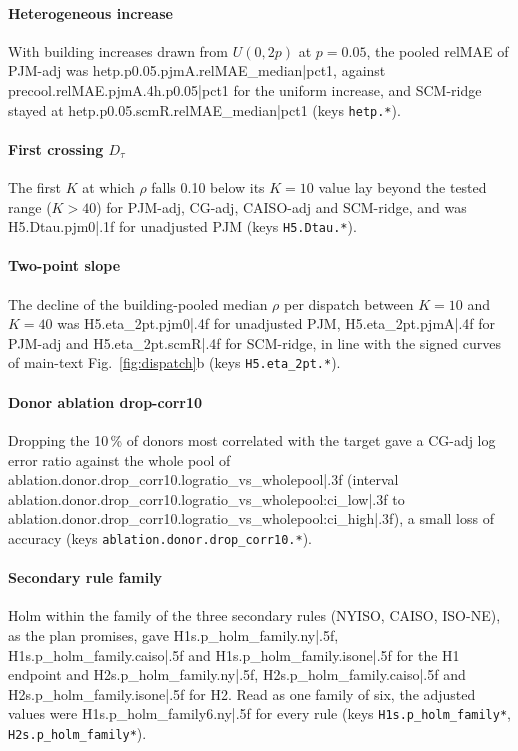 \paragraph{Heterogeneous increase} With building increases drawn from $U(0,2p)$ at $p=0.05$, the pooled relMAE of PJM-adj was {{hetp.p0.05.pjmA.relMAE_median|pct1}}, against {{precool.relMAE.pjmA.4h.p0.05|pct1}} for the uniform increase, and SCM-ridge stayed at {{hetp.p0.05.scmR.relMAE_median|pct1}} (keys \texttt{hetp.*}).

\paragraph{First crossing $D_\tau$} The first $K$ at which $\rho$ falls 0.10 below its $K=10$ value lay beyond the tested range ($K>40$) for PJM-adj, CG-adj, CAISO-adj and SCM-ridge, and was {{H5.Dtau.pjm0|.1f}} for unadjusted PJM (keys \texttt{H5.Dtau.*}).

\paragraph{Two-point slope} The decline of the building-pooled median $\rho$ per dispatch between $K=10$ and $K=40$ was {{H5.eta_2pt.pjm0|.4f}} for unadjusted PJM, {{H5.eta_2pt.pjmA|.4f}} for PJM-adj and {{H5.eta_2pt.scmR|.4f}} for SCM-ridge, in line with the signed curves of main-text Fig.~\ref{fig:dispatch}b (keys \texttt{H5.eta\_2pt.*}).

\paragraph{Donor ablation drop-corr10} Dropping the 10\,\% of donors most correlated with the target gave a CG-adj log error ratio against the whole pool of {{ablation.donor.drop_corr10.logratio_vs_wholepool|.3f}} (interval {{ablation.donor.drop_corr10.logratio_vs_wholepool:ci_low|.3f}} to {{ablation.donor.drop_corr10.logratio_vs_wholepool:ci_high|.3f}}), a small loss of accuracy (keys \texttt{ablation.donor.drop\_corr10.*}).

\paragraph{Secondary rule family} Holm within the family of the three secondary rules (NYISO, CAISO, ISO-NE), as the plan promises, gave {{H1s.p_holm_family.ny|.5f}}, {{H1s.p_holm_family.caiso|.5f}} and {{H1s.p_holm_family.isone|.5f}} for the H1 endpoint and {{H2s.p_holm_family.ny|.5f}}, {{H2s.p_holm_family.caiso|.5f}} and {{H2s.p_holm_family.isone|.5f}} for H2. Read as one family of six, the adjusted values were {{H1s.p_holm_family6.ny|.5f}} for every rule (keys \texttt{H1s.p\_holm\_family*}, \texttt{H2s.p\_holm\_family*}).

